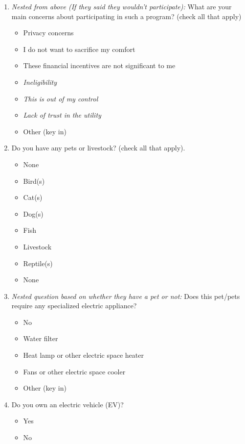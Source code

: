\documentclass{article}
\begin{document}
\begin{enumerate}
\item \textit{Nested from above (If they said they wouldn't participate):}
What are your main concerns about participating in such a program? (check all that apply)
\begin{itemize}
  \item[\checkbox] Privacy concerns
  \item[\checkbox] I do not want to sacrifice my comfort
  \item[\checkbox] These financial incentives are not significant to me
  \item[\checkbox] \textit{Ineligibility}
  \item[\checkbox] \textit{This is out of my control}
  \item[\checkbox] \textit{Lack of trust in the utility}
  \item[\checkbox] Other (key in)
\end{itemize}
 

\item Do you have any pets or livestock? (check all that apply).
\begin{itemize}
  \item[\checkbox] None
  \item[\checkbox] Bird(s)
  \item[\checkbox] Cat(s)
  \item[\checkbox] Dog(s)
  \item[\checkbox] Fish
  \item[\checkbox] Livestock
  \item[\checkbox] Reptile(s)
  \item[\checkbox] None
\end{itemize}
 

\item \textit{Nested question based on whether they have a pet or not:}
Does this pet/pets require any specialized electric appliance?
\begin{itemize}
  \item[\checkbox] No
  \item[\checkbox] Water filter
  \item[\checkbox] Heat lamp or other electric space heater
  \item[\checkbox] Fans or other electric space cooler
  \item[\checkbox] Other (key in)
\end{itemize}
 

\item Do you own an electric vehicle (EV)?
\begin{itemize}
  \item[\checkbox] Yes
  \item[\checkbox] No
\end{itemize}
 


\end{enumerate}
\end{document}

